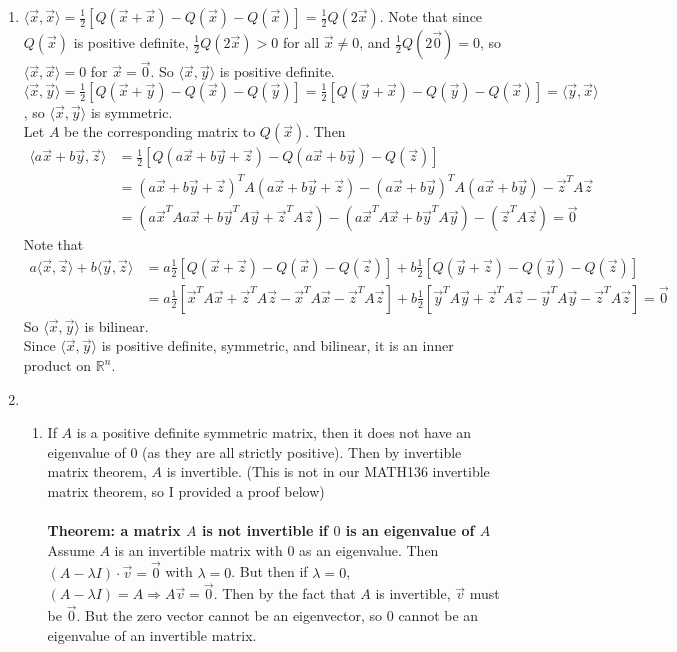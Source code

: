 \documentclass[10pt,english]{article}
\begin{document}
\begin{enumerate}
\pagebreak
\item $\langle\vec{x},\vec{x}\rangle=\frac{1}{2}[Q(\vec{x}+\vec{x})-Q(\vec{x})-Q(\vec{x})]=\frac{1}{2}Q(2\vec{x})$. Note that since $Q(\vec{x})$ is positive definite, $\frac{1}{2}Q(2\vec{x})>0$ for all $\vec{x}\neq0$, and $\frac{1}{2}Q(2\vec{0})=0$, so $\langle\vec{x},\vec{x}\rangle=0$ for $\vec{x}=\vec{0}$. So $\langle\vec{x},\vec{y}\rangle$ is positive definite.\\ 
$\langle\vec{x},\vec{y}\rangle=\frac{1}{2}[Q(\vec{x}+\vec{y})-Q(\vec{x})-Q(\vec{y})]=\frac{1}{2}[Q(\vec{y}+\vec{x})-Q(\vec{y})-Q(\vec{x})]=\langle\vec{y},\vec{x}\rangle$, so $\langle\vec{x},\vec{y}\rangle$ is symmetric. \\ 
Let $A$ be the corresponding matrix to $Q(\vec{x})$. Then 
\begin{align*}\langle a\vec{x}+b\vec{y},\vec{z}\rangle&=\frac{1}{2}[Q(a\vec{x}+b\vec{y}+\vec{z})-Q(a\vec{x}+b\vec{y})-Q(\vec{z})]\\&=(a\vec{x}+b\vec{y}+\vec{z})^TA(a\vec{x}+b\vec{y}+\vec{z})-(a\vec{x}+b\vec{y})^TA(a\vec{x}+b\vec{y})-\vec{z}^TA\vec{z}\\&=(a\vec{x}^TAa\vec{x}+b\vec{y}^TA\vec{y}+\vec{z}^TA\vec{z})-(a\vec{x}^TA\vec{x}+b\vec{y}^TA\vec{y})-(\vec{z}^TA\vec{z})=\vec{0}
\end{align*} Note that 
\begin{align*}a\langle\vec{x},\vec{z}\rangle+b\langle\vec{y},\vec{z}\rangle&=a\frac{1}{2}[Q(\vec{x}+\vec{z})-Q(\vec{x})-Q(\vec{z})]+b\frac{1}{2}[Q(\vec{y}+\vec{z})-Q(\vec{y})-Q(\vec{z})]\\&=a\frac{1}{2}[\vec{x}^TA\vec{x}+\vec{z}^TA\vec{z}-\vec{x}^TA\vec{x}-\vec{z}^TA\vec{z}]+b\frac{1}{2}[\vec{y}^TA\vec{y}+\vec{z}^TA\vec{z}-\vec{y}^TA\vec{y}-\vec{z}^TA\vec{z}]=\vec{0}\end{align*}
So $\langle\vec{x},\vec{y}\rangle$ is bilinear.\\ 
Since $\langle\vec{x},\vec{y}\rangle$ is positive definite, symmetric, and bilinear, it is an inner product on $\mathbb{R}^n$. 

\pagebreak
\item \begin{enumerate}
    \item If $A$ is a positive definite symmetric matrix, then it does not have an eigenvalue of 0 (as they are all strictly positive). Then by invertible matrix theorem, $A$ is invertible. (This is not in our MATH136 invertible matrix theorem, so I provided a proof below) \\\\
    \textbf{Theorem: a matrix $A$ is not invertible if $0$ is an eigenvalue of $A$}\\ 
    Assume $A$ is an invertible matrix with $0$ as an eigenvalue. Then $(A-\lambda I)\cdot\vec{v}=\vec{0}$ with $\lambda=0$. But then if $\lambda=0$, $(A-\lambda I)=A\Rightarrow A\vec{v}=\vec{0}$. Then by the fact that $A$ is invertible, $\vec{v}$ must be $\vec{0}$. But the zero vector cannot be an eigenvector, so $0$ cannot be an eigenvalue of an invertible matrix. 
    

\end{enumerate}
\end{enumerate}
\end{document}
